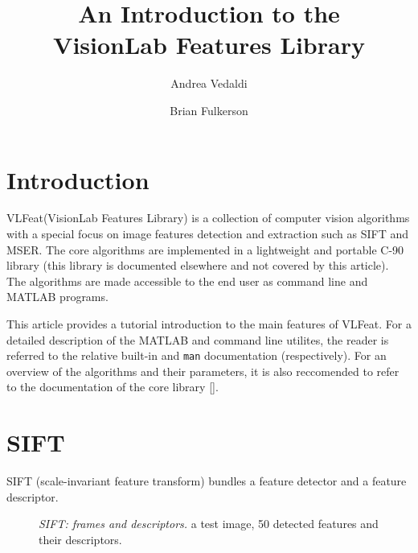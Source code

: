 \documentclass{article}
\title{An Introduction to the\\ VisionLab Features Library}
\author{Andrea Vedaldi \and Brian Fulkerson}
\newcommand{\VLFeat}{{\sc VLFeat}\xspace}
\begin{document}

\ifpdf\twocolumn\fi
\maketitle{}
\ifpdf\tableofcontents{}\fi

\section{Introduction}\label{intro}

\VLFeat (VisionLab Features Library) is a collection of computer
vision algorithms with a special focus on image features detection and
extraction such as SIFT and MSER. The core algorithms are implemented
in a lightweight and portable C-90 library (this library is documented
elsewhere and not covered by this article). The algorithms are made
accessible to the end user as command line and MATLAB programs.

This article provides a tutorial introduction to the main features of
\VLFeat. For a detailed description of the MATLAB and command line
utilites, the reader is referred to the relative built-in and
\verb$man$ documentation (respectively). For an overview of the
algorithms and their parameters, it is also reccomended to refer to
the documentation of the core library [].

\section{SIFT}\label{sift}

SIFT (scale-invariant feature transform) bundles a feature detector
and a feature descriptor.

\begin{figure*}
\hfill
{}
\hfill
{}
\caption{{\em SIFT: frames and descriptors.} 
  a test image,  50 detected features
   and their
  descriptors.}\label{fig:sift-intro}
\end{figure*}
\end{document}
